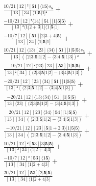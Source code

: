 \documentclass[varwidth, border=5pt]{standalone}
\begin{document}
\begin{my}
$\begin{gathered}
\scriptscriptstyle\frac{10/21[12]²[𝟓1]⟨1𝟓⟩s_{𝟓}}{[13][34]⟨1|𝟓|1]²} +\\
\scriptscriptstyle\frac{-10/21[12]²⟨14⟩[𝟓1][1|𝟓|𝟓⟩}{[13]²⟨1|2+3|1]⟨1|𝟓|1]} +\\
\scriptscriptstyle\frac{-10/7[12][𝟓1][2|3+4|𝟓⟩}{[13][34]⟨1|𝟓|1]} +\\
\scriptscriptstyle\frac{10/21[12]⟨13⟩[23]⟨34⟩[𝟓1][1|𝟓|𝟓⟩s_{𝟓}}{[13](⟨2|3|𝟓|1|2]-⟨3|4|𝟓|1|3])²} +\\
\scriptscriptstyle\frac{-10/21[12]²⟨23⟩[23][𝟓3][1|𝟓|𝟓⟩}{[13]²[34](⟨2|3|𝟓|1|2]-⟨3|4|𝟓|1|3])} +\\
\scriptscriptstyle\frac{-20/21[12][23]⟨34⟩[𝟓1][1|𝟓|𝟓⟩}{[13]²(⟨2|3|𝟓|1|2]-⟨3|4|𝟓|1|3])} +\\
\scriptscriptstyle\frac{-20/21[12]⟨13⟩⟨34⟩[𝟓1][1|𝟓|𝟓⟩}{[13]⟨23⟩(⟨2|3|𝟓|1|2]-⟨3|4|𝟓|1|3])} +\\
\scriptscriptstyle\frac{20/21[12][23]⟨34⟩[𝟓4][1|𝟓|𝟓⟩}{[13][34](⟨2|3|𝟓|1|2]-⟨3|4|𝟓|1|3])} +\\
\scriptscriptstyle\frac{-10/21[12][23][𝟓|1+2|3⟩[1|𝟓|𝟓⟩}{[13][34](⟨2|3|𝟓|1|2]-⟨3|4|𝟓|1|3])} +\\
\scriptscriptstyle\frac{10/21[12]²[𝟓3][3|𝟓|𝟓⟩}{[13]²[34]⟨1|2+4|3]} +\\
\scriptscriptstyle\frac{-10/7[12]²[𝟓3]⟨1𝟓⟩}{[13][34]⟨1|2+4|3]} +\\
\scriptscriptstyle\frac{20/21[12][𝟓3][2|𝟓|𝟓⟩}{[13][34]⟨1|2+4|3]} \phantom{+}
\end{gathered}$
\end{my}
\end{document}
